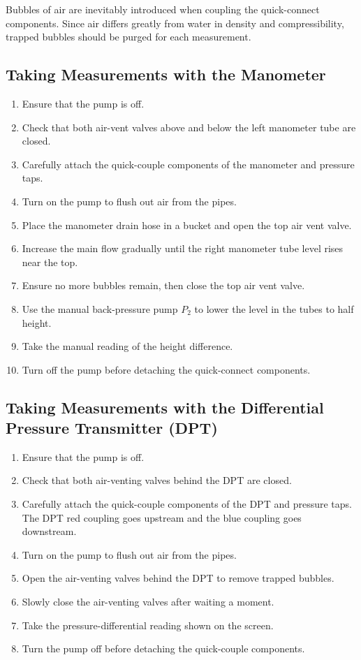 \documentclass[12pt,letterpaper]{article}
\begin{document}
Bubbles of air are inevitably introduced when coupling the quick-connect components. Since air differs greatly from water in density and compressibility, trapped bubbles should be purged for each measurement.

\subsection*{Taking Measurements with the Manometer}
\begin{enumerate}[leftmargin=*]
    \item Ensure that the pump is off.
    \item Check that both air-vent valves above and below the left manometer tube are closed.
    \item Carefully attach the quick-couple components of the manometer and pressure taps.
    \item Turn on the pump to flush out air from the pipes.
    \item Place the manometer drain hose in a bucket and open the top air vent valve.
    \item Increase the main flow gradually until the right manometer tube level rises near the top.
    \item Ensure no more bubbles remain, then close the top air vent valve.
    \item Use the manual back-pressure pump \(P_2\) to lower the level in the tubes to half height.
    \item Take the manual reading of the height difference.
    \item Turn off the pump before detaching the quick-connect components.
\end{enumerate}

\subsection*{Taking Measurements with the Differential Pressure Transmitter (DPT)}
\begin{enumerate}[leftmargin=*]
    \item Ensure that the pump is off.
    \item Check that both air-venting valves behind the DPT are closed.
    \item Carefully attach the quick-couple components of the DPT and pressure taps. The DPT red coupling goes upstream and the blue coupling goes downstream.
    \item Turn on the pump to flush out air from the pipes.
    \item Open the air-venting valves behind the DPT to remove trapped bubbles.
    \item Slowly close the air-venting valves after waiting a moment.
    \item Take the pressure-differential reading shown on the screen.
    \item Turn the pump off before detaching the quick-couple components.
\end{enumerate}
\end{document}
